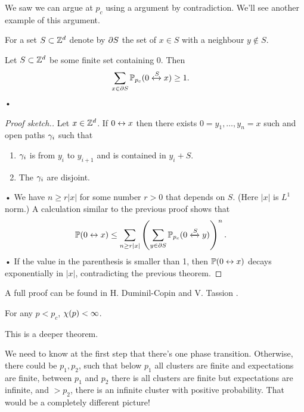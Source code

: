 We saw we can argue at $p_c$ using a argument by contradiction. We'll see another example of this argument.

For a set $S\subset \mathbb{Z}^d$ denote by $\partial S$ the set of $x\in S$ with a neighbour $y\nin S$. 
\begin{thm}
Let $S\subset \mathbb{Z}^d$ be some finite set containing 0. Then
\begin{align*}
\sum_{x\in \partial S} \mathbb{P}_{p_c} (0\xleftrightarrow{S} x) &\ge 1.
\end{align*}•
\end{thm}
\begin{proof}[Proof sketch.]
Let $x\in \mathbb{Z}^d$. If $0\leftrightarrow x$ then there exists $0=y_1,\ldots, y_n=x$ such and open paths $\gamma_i$ such that 
\begin{enumerate}
\item
$\gamma_i$ is from $y_i$ to $y_{i+1}$ and is contained in $y_i+S$.
\item 
The $\gamma_i$ are disjoint. 
\end{enumerate}•
We have $n\ge r|x|$ for some number $r>0$ that depends on $S$. (Here $|x|$ is $L^1$ norm.)
A calculation similar to the previous proof shows that
\begin{align*}
\mathbb{P}(0\leftrightarrow x) &\le \sum_{n\ge r|x|} \left( {\sum_{y\in \partial S} \mathbb{P}_{p_c}(0\xleftrightarrow{S} y)} \right)^n.
\end{align*}•
If the value in the parenthesis is smaller than 1, then $\mathbb{P}(0\leftrightarrow x)$ decays exponentially in $|x|$, contradicting the previous theorem.
\end{proof}

A full proof can be found in H. Duminil-Copin and V. Tassion \cite{duminil2016new}.

\begin{thm}
For any $p<p_c$, $\chi(p)<\infty$. 
\end{thm}
This is a deeper theorem.

We need to know at the first step that there's one phase transition. Otherwise, there could be $p_1,p_2$, such that below $p_1$ all clusters are finite and expectations are finite, between $p_1$ and $p_2$ there is all clusters are finite but expectations are infinite, and $>p_2$, there is an infinite cluster with positive probability. That would be a completely different picture!

